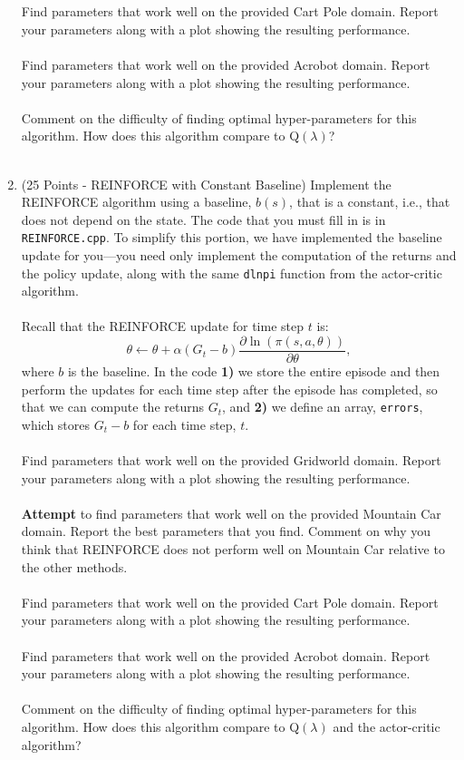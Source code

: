 \documentclass{article}
\begin{document}
\begin{enumerate}
    \\\\
     Find parameters that work well on the provided Cart Pole domain. Report your parameters along with a plot showing the resulting performance.
    \\\\
     Find parameters that work well on the provided Acrobot domain. Report your parameters along with a plot showing the resulting performance.
    \\\\
     Comment on the difficulty of finding optimal hyper-parameters for this algorithm. How does this algorithm compare to Q$(\lambda)$?
    \\\\
    \item (25 Points - REINFORCE with Constant Baseline) Implement the REINFORCE algorithm using a baseline, $b(s)$, that is a constant, i.e., that does not depend on the state. The code that you must fill in is in \texttt{REINFORCE.cpp}. To simplify this portion, we have implemented the baseline update for you---you need only implement the computation of the returns and the policy update, along with the same \texttt{dlnpi} function from the actor-critic algorithm.
    \\\\
    Recall that the REINFORCE update for time step $t$ is:
    $$
    \theta \gets \theta + \alpha (G_t-b)\frac{\partial \ln(\pi(s,a,\theta))}{\partial \theta},
    $$
    where $b$ is the baseline. In the code {\bf 1)} we store the entire episode and then perform the updates for each time step after the episode has completed, so that we can compute the returns $G_t$, and {\bf 2)} we define an array, \texttt{errors}, which stores $G_t-b$ for each time step, $t$.
    \\\\
     Find parameters that work well on the provided Gridworld domain. Report your parameters along with a plot showing the resulting performance.
    \\\\
     \textbf{Attempt} to find parameters that work well on the provided Mountain Car domain. Report the best parameters that you find. Comment on why you think that REINFORCE does not perform well on Mountain Car relative to the other methods.
    \\\\
     Find parameters that work well on the provided Cart Pole domain. Report your parameters along with a plot showing the resulting performance.
    \\\\
     Find parameters that work well on the provided Acrobot domain. Report your parameters along with a plot showing the resulting performance.
    \\\\
     Comment on the difficulty of finding optimal hyper-parameters for this algorithm. How does this algorithm compare to Q$(\lambda)$ and the actor-critic algorithm?
\end{enumerate}
\end{document}
